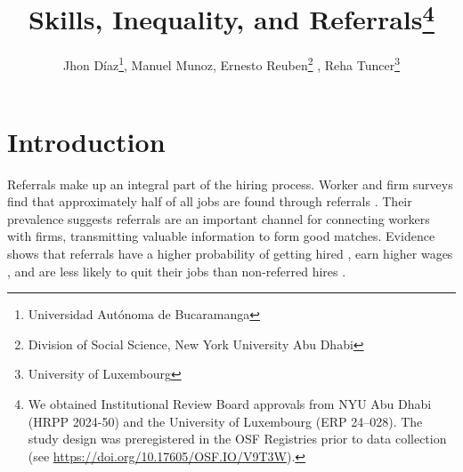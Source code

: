 \documentclass[11pt,a4paper,oneside]{article}
\title{Skills, Inequality, and Referrals\footnote{We obtained Institutional Review Board approvals from NYU Abu Dhabi (HRPP 2024-50) and the University of Luxembourg (ERP 24–028). The study design was preregistered in the OSF Registries prior to data collection (see \url{https://doi.org/10.17605/OSF.IO/V9T3W}).} }
\author{Jhon Díaz\footnote{Universidad Autónoma de Bucaramanga}, Manuel Munoz\footremember{liser}{Luxembourg Institute of Socio-Economic Research}, Ernesto Reuben\footnote{Division of Social Science, New York University Abu Dhabi} \footrecall{liser}, Reha Tuncer\footnote{University of Luxembourg}}
\begin{document}
\maketitle




\section{Introduction}
Referrals make up an integral part of the hiring process. Worker and firm surveys find that approximately half of all jobs are found through referrals \citep{topa2011labor}. Their prevalence suggests referrals are an important channel for connecting workers with firms, transmitting valuable information to form good matches. Evidence shows that referrals have a higher probability of getting hired \citep{brown2016informal}, earn higher wages \citep{bayer2008place, hellerstein2014labor, hellerstein2019labor, schmutte2015job, dustmann2016referral}, and are less likely to quit their jobs than non-referred hires \citep{hellerstein2019labor, dustmann2016referral, friebel2023employee}. 
\end{document}
